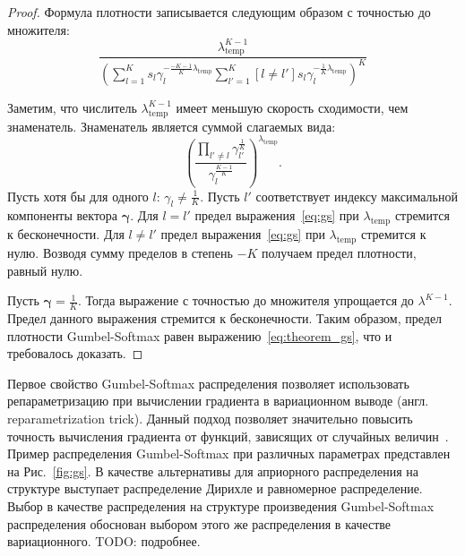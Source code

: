\begin{proof} 
Формула плотности записывается следующим образом с точностью до множителя:
\[
       \frac{\lambda_{\text{temp}}^{K-1}}{\left(\sum_{l=1}^K s_l\gamma_l^{-\frac{-K-1}{K}\lambda_\text{temp}}\sum_{l'=1}^K [l \neq l']s_l\gamma_l^{-\frac{1}{K}\lambda_\text{temp}}\right)^{K}}
\]


Заметим, что числитель $\lambda_{\text{temp}}^{K-1}$ имеет меньшую скорость сходимости, чем знаменатель. 
Знаменатель является суммой слагаемых вида:
\begin{equation}
\label{eq:gs}
    \left(\frac{\prod_{l' \neq l} \gamma_{l'}^{\frac{1}{K}}}{\gamma_l^{\frac{K-1}{K}}}\right)^{\lambda_{\text{temp}}}.
\end{equation}
Пусть хотя бы для одного $l$: $\gamma_l \neq \frac{1}{K}$. Пусть $l'$ соответствует индексу максимальной компоненты вектора $\boldsymbol{\gamma}$.
Для $l=l'$ предел выражения~\eqref{eq:gs} при $\lambda_{\text{temp}}$ стремится к бесконечности. Для $l\neq l'$ предел выражения~\eqref{eq:gs} при $\lambda_{\text{temp}}$ стремится к нулю. Возводя сумму пределов в степень $-K$ получаем предел плотности, равный нулю.

Пусть $\boldsymbol{\gamma} = \frac{1}{K}$.
Тогда выражение с точностью до множителя упрощается до $\lambda^{K-1}$. Предел данного выражения стремится к бесконечности.
Таким образом, предел плотности Gumbel-Softmax равен выражению~\eqref{eq:theorem_gs}, что и требовалось доказать.

\end{proof}


Первое свойство Gumbel-Softmax распределения позволяет использовать репараметризацию при вычислении градиента в вариационном выводе (англ. reparametrization trick). Данный подход позволяет значительно повысить точность вычисления градиента от функций, зависящих от случайных величин~\cite{reparametrization}.
Пример распределения Gumbel-Softmax при различных параметрах представлен на Рис.~\ref{fig:gs}. В качестве альтернативы для априорного распределения на структуре выступает  распределение Дирихле и равномерное распределение. Выбор в качестве распределения на структуре произведения Gumbel-Softmax распределения обоснован выбором этого же распределения в качестве вариационного. TODO: подробнее.

